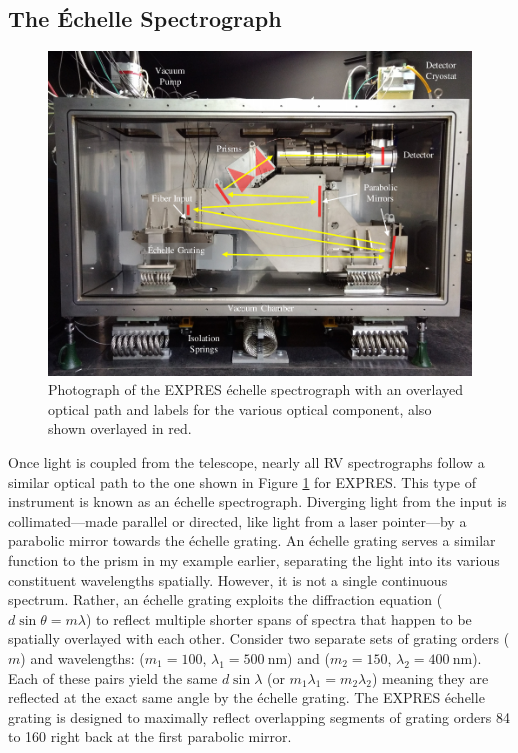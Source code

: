 \subsection{The \'Echelle Spectrograph} \label{intro:optics:echelle}

\begin{figure}
    \centering
    \includegraphics[width=\textwidth]{figures-1/expres.pdf}
    \caption[The EXPRES \'Echelle Spectrograph and Optical Path]{Photograph of the EXPRES \'echelle spectrograph with an overlayed optical path and labels for the various optical component, also shown overlayed in red.}
    \label{fig:expres}
\end{figure}

Once light is coupled from the telescope, nearly all RV spectrographs follow a similar optical path to the one shown in Figure \ref{fig:expres} for EXPRES. This type of instrument is known as an \'echelle spectrograph. Diverging light from the input is collimated---made parallel or directed, like light from a laser pointer---by a parabolic mirror towards the \'echelle grating. An \'echelle grating serves a similar function to the prism in my example earlier, separating the light into its various constituent wavelengths spatially. However, it is not a single continuous spectrum. Rather, an \'echelle grating exploits the diffraction equation ($d \sin{\theta} = m \lambda$) to reflect multiple shorter spans of spectra that happen to be spatially overlayed with each other. Consider two separate sets of grating orders ($m$) and wavelengths: ($m_1=100$, $\lambda_1=500~\mathrm{nm}$) and ($m_2=150$, $\lambda_2=400~\mathrm{nm}$). Each of these pairs yield the same $d\sin{\lambda}$ (or $m_1\lambda_1 = m_2\lambda_2$) meaning they are reflected at the exact same angle by the \'echelle grating. The EXPRES \'echelle grating is designed to maximally reflect overlapping segments of grating orders 84 to 160 right back at the first parabolic mirror.


